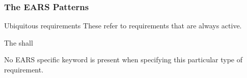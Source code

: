\documentclass[aspectratio=169]{beamer}
\begin{document}
\begin{frame}[fragile]
  \frametitle{The EARS Patterns}
  \begin{block}{Ubiquitous requirements}
    These refer to requirements that are always active. 
    \begin{center}
    The {\color{red}{$<$system name$>$}} shall {\color{blue}{$<$system response$>$}}
    \end{center}
    No EARS specific keyword is present when specifying this particular type of requirement.
  \end{block}


    



\end{frame}
\end{document}
